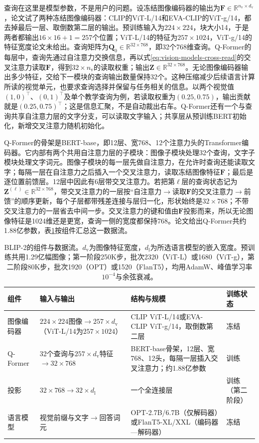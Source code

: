 查询在这里是模型参数，不是用户的问题。设冻结图像编码器的输出为$\bm F\in\mathbb R^{n_{\mathrm v}\times d_{\mathrm v}}$，论文试了两种冻结图像编码器：CLIP的ViT-L/14和EVA-CLIP的ViT-g/14，都去掉最后一层、取倒数第二层的输出。预训练输入为$224\times224$，块大小14，于是两者都输出$16\times16+1=257$个位置；ViT-L/14的特征为$257\times1024$，ViT-g/14的特征宽度论文未给出。查询矩阵为$\bm Q_0\in\mathbb R^{32\times768}$，即32个768维查询。Q-Former的每层中，查询先通过自注意力交换信息，再以式\eqref{eq:vision-models-cross-read}的交叉注意力读取$\bm F$，得到$32\times n_{\mathrm v}$的读取权重；输出$\bm Z\in\mathbb R^{32\times768}$。无论图像编码器输出多少特征，交给下一模块的查询输出数量保持32个。这种压缩减少后续语言计算所读的视觉单元，也要求查询选择并保留与任务相关的信息。以两个视觉值$(1,0)^\top$、$(0,1)^\top$及单个教学查询为例，若读取权重为$(0.25,0.75)$，输出贡献就是$(0.25,0.75)^\top$；这是信息汇聚，不是自动裁出右车。Q-Former还有一个与查询共享自注意力层的文字分支，可以读取文字输入；共享层从预训练BERT初始化，新增交叉注意力随机初始化。

Q-Former的骨架是BERT-base，即12层、宽768、12个注意力头的Transformer编码器。它内部有两个共用自注意力层的子模块：图像子模块处理32个查询，文字子模块处理文字词元。图像子模块的每一层先做自注意力，在允许时查询还能读取文字；每隔一层在自注意力之后插入一个交叉注意力，读取冻结图像特征$\bm F$；最后是逐位置前馈层。12层中因此有6层带交叉注意力。若把第$\ell$层的查询状态记为$\bm Z^{(\ell)}\in\mathbb R^{32\times768}$，带交叉注意力的一层按“自注意力$\to$读取$\bm F$的交叉注意力$\to$前馈”的顺序更新，每个子层都带残差连接与层归一化，形状始终是$32\times768$；不带交叉注意力的一层省去中间一步。交叉注意力的键和值由$\bm F$投影而来，所以无论图像特征是1024维还是更宽，查询一侧的宽度都保持768。论文给出Q-Former共约1.88亿参数，表\ref{tab:vision-models-blip2-config}按组件汇总这一数据流。

\begin{table}[htbp]
  \centering
  \small
  \begin{tabularx}{\linewidth}{@{}p{14mm}XXp{12mm}@{}}
    \toprule
    组件 & 输入与输出 & 结构与规模 & 训练状态\\
    \midrule
    图像编码器 & $224\times224$图像$\to257\times d_{\mathrm v}$（ViT-L/14为$257\times1024$） & CLIP ViT-L/14或EVA-CLIP ViT-g/14，取倒数第二层 & 冻结\\
    Q-Former & 32个查询与$257\times d_{\mathrm v}$特征$\to32\times768$ & BERT-base骨架，12层、宽768、12头，每隔一层插入交叉注意力；约1.88亿参数 & 训练\\
    投影 & $32\times768\to32\times d_{\mathrm l}$ & 一个全连接层 & 训练（第二阶段）\\
    语言模型 & 视觉前缀与文字$\to$回答词元 & OPT-2.7B/6.7B（仅解码器）或FlanT5-XL/XXL（编码器—解码器） & 冻结\\
    \bottomrule
  \end{tabularx}
  \caption{BLIP-2的组件与数据流。$d_{\mathrm v}$为图像特征宽度，$d_{\mathrm l}$为所选语言模型的嵌入宽度。预训练共用1.29亿幅图像；第一阶段250K步，批次2320（ViT-L）或1680（ViT-g），第二阶段80K步，批次1920（OPT）或1520（FlanT5），均用AdamW、峰值学习率$10^{-4}$与余弦衰减。}
  \label{tab:vision-models-blip2-config}
\end{table}


